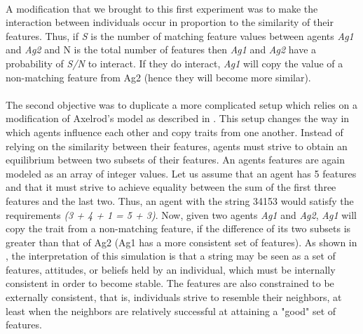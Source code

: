 \documentclass[twoside, 11pt, a4paper]{article}
\begin{document}
\paragraph*{}A modification that we brought to this first experiment was to make the interaction between individuals occur in proportion to the similarity of their features. Thus, if \textit{S} is the number of matching feature values between agents \textit{Ag1} and \textit{Ag2} and N is the total number of features then \textit{Ag1} and \textit{Ag2} have a probability of \textit{S/N} to interact. If they do interact, \textit{Ag1} will copy the value of a non-matching feature from Ag2 (hence they will become more similar). 

\paragraph*{}The second objective was to duplicate a more complicated setup which relies on a modification of Axelrod's model as described in \cite{Kennedy01}. This setup changes the way in which agents influence each other and copy traits from one another. Instead of relying on the similarity between their features, agents must strive to obtain an equilibrium between two subsets of their features. An agents features are again modeled as an array of integer values. Let us assume that an agent has 5 features and that it must strive to achieve equality between the sum of the first three features and the last two. Thus, an agent with the string 34153 would satisfy the requirements \textit{(3 + 4 + 1 = 5 + 3)}. Now, given two agents \textit{Ag1} and \textit{Ag2}, \textit{Ag1} will copy the trait from a non-matching feature, if the difference of its two subsets is greater than that of Ag2 (Ag1 has a more consistent set of features). As shown in \cite{Kennedy01}, the interpretation of this simulation is that a string may be seen as a set of features, attitudes, or beliefs held by an individual, which must be internally consistent in order to become stable. The features are also constrained to be externally consistent, that is, individuals strive to resemble their neighbors, at least when the neighbors are relatively successful at attaining a "good" set of features.
\end{document}
